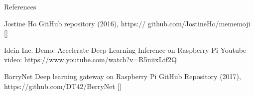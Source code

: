 \documentclass[compress]{beamer}
\begin{document}
\begin{frame}{References}
    \begin{thebibliography}{10}

\beamertemplatearticlebibitems
      Jostine Ho       
      \newblock {}
      \newblock GitHub repository (2016), https:// github.com/JostineHo/mememoji [\href{https:// github.com/JostineHo/mememoji}{\faGithub}]

	Idein Inc.
	\newblock Demo: Accelerate Deep Learning Inference on Raspberry Pi
	\newblock Youtube video: https://www.youtube.com/watch?v=R5niixLtf2Q

	BarryNet
	\newblock Deep learning gateway on Raspberry Pi
	\newblock GitHub Repository (2017), https://github.com/DT42/BerryNet [\href{https://github.com/DT42/BerryNet}{\faGithub}]

    \end{thebibliography}
\end{frame}



%
%

\end{document}
